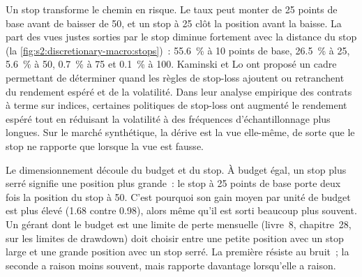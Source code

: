 Un stop transforme le chemin en risque. Le taux peut monter de 25 points de base avant de baisser de 50, et un stop à 25 clôt la position avant la baisse. La part des vues justes sorties par le stop
diminue fortement avec la distance du stop (la \cref{fig:s2:discretionary-macro:stops})~: 55.6~\% à 10 points de base,
26.5~\% à 25, 5.6~\% à 50, 0.7~\% à 75 et 0.1~\% à 100. Kaminski et Lo ont proposé un cadre permettant de déterminer quand les règles de stop-loss ajoutent ou retranchent du rendement espéré
et de la volatilité. Dans leur analyse empirique des contrats à terme sur indices, certaines politiques de stop-loss ont augmenté le rendement espéré tout en réduisant la volatilité à des fréquences
d'échantillonnage plus longues. Sur le marché synthétique, la dérive est la vue elle-même, de sorte que le stop ne rapporte que lorsque la vue est fausse.

\begin{omfigure}

\label{fig:s2:discretionary-macro:stops}
\end{omfigure}

Le dimensionnement découle du budget et du stop. À budget égal, un stop plus serré signifie une position plus grande~: le stop à 25 points de base porte
deux fois la position du stop à 50. C'est pourquoi son gain moyen par unité de budget est plus élevé (1.68 contre 0.98), alors même qu'il est sorti beaucoup plus souvent. Un gérant
dont le budget est une limite de perte mensuelle (livre~8, chapitre~28, sur les limites de drawdown) doit choisir entre une petite position avec un stop large et une
grande position avec un stop serré. La première résiste au bruit~; la seconde a raison moins souvent, mais rapporte davantage lorsqu'elle a raison.

